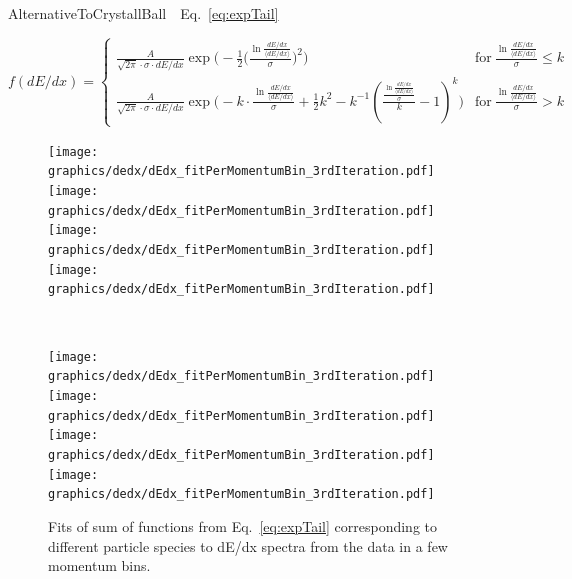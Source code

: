 AlternativeToCrystallBall~\cite{AlternativeToCrystallBall}~Eq.~\eqref{eq:expTail}

\begin{equation}\label{eq:expTail}
	f(dE/dx)=\left\{
                \begin{array}{ll}
                  \frac{A}{\sqrt{2\pi}\cdot \sigma\cdot dE/dx}\exp{\Bigg(-\frac{1}{2}\Big(\frac{\ln{\frac{dE/dx}{\langle dE/dx\rangle}}}{\sigma}\Big)^{2}\Bigg)} & \textrm{for}~\frac{\ln{\frac{dE/dx}{\langle dE/dx\rangle}}}{\sigma} \leq k \\
                  \frac{A}{\sqrt{2\pi}\cdot \sigma\cdot dE/dx}\exp{\Bigg(-k\cdot \frac{\ln{\frac{dE/dx}{\langle dE/dx\rangle}}}{\sigma} + \frac{1}{2}k^{2} - k^{-1}\left(\frac{\frac{\ln{\frac{dE/dx}{\langle dE/dx\rangle}}}{\sigma}}{k}-1\right)^{k} \Bigg)} & \textrm{for}~\frac{\ln{\frac{dE/dx}{\langle dE/dx\rangle}}}{\sigma} > k
                \end{array}
              \right.
\end{equation}



\begin{figure}[hb]
\centering
\parbox{0.495\textwidth}{
  \centering
  \texttt{[image: graphics/dedx/dEdx\_fitPerMomentumBin\_3rdIteration.pdf]}\\
  \texttt{[image: graphics/dedx/dEdx\_fitPerMomentumBin\_3rdIteration.pdf]}\\
  \texttt{[image: graphics/dedx/dEdx\_fitPerMomentumBin\_3rdIteration.pdf]}\\
  \texttt{[image: graphics/dedx/dEdx\_fitPerMomentumBin\_3rdIteration.pdf]}
}~
\parbox{0.495\textwidth}{
  \centering
  \texttt{[image: graphics/dedx/dEdx\_fitPerMomentumBin\_3rdIteration.pdf]}\\
  \texttt{[image: graphics/dedx/dEdx\_fitPerMomentumBin\_3rdIteration.pdf]}\\
  \texttt{[image: graphics/dedx/dEdx\_fitPerMomentumBin\_3rdIteration.pdf]}\\
  \texttt{[image: graphics/dedx/dEdx\_fitPerMomentumBin\_3rdIteration.pdf]}
}%
\caption[Fits to dE/dx spectra from the data.]{Fits of sum of functions from Eq.~\eqref{eq:expTail} corresponding to different particle species to dE/dx spectra from the data in a few momentum bins.}\label{fig:dEdxFits}
\end{figure}



